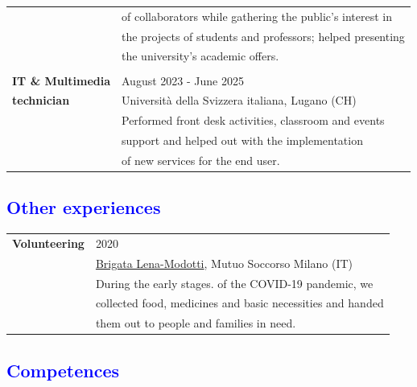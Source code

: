 \documentclass[12pt]{article}
\begin{document}
\begin{table}[H]
\begin{tabular}{ll}
		& of collaborators while gathering the public's interest in\\
		& the projects of students and professors; helped presenting\\
		& the university's academic offers.\\
		\\
		\textbf{IT \& Multimedia} & August 2023 - June 2025\\
        \textbf{technician} & Università della Svizzera italiana, Lugano (CH)\\
		& Performed front desk activities, classroom and events \\
        & support and helped out with the implementation \\
        & of new services for the end user.\\
	\end{tabular}
\end{table}

\newpage
\textcolor{blue}{\section*{Other experiences}}

\begin{table}[H]
	\begin{tabular}{ll}
		\textbf{Volunteering} &2020\\
        & \href{https://www.mutuosoccorsomilano.it/brigata-lena-modotti/}{Brigata Lena-Modotti}, Mutuo Soccorso Milano (IT)\\ 
        & During the early stages. of the COVID-19 pandemic, we\\
        & collected food, medicines and basic necessities and handed\\
        & them out to people and families in need.
	\end{tabular}
\end{table}


\textcolor{blue}{\section*{Competences} }
\end{document}
